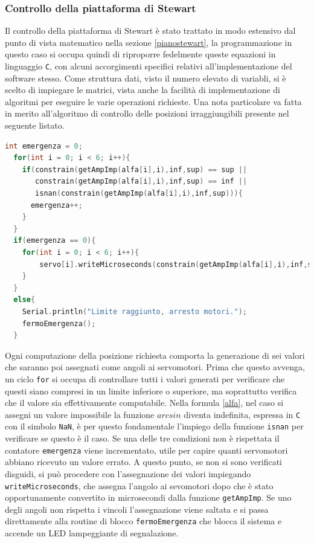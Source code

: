 \documentclass[12pt,twoside,openright]{article}
\begin{document}
\subsubsection{Controllo della piattaforma di Stewart}
Il controllo della piattaforma di Stewart è stato trattato in modo estensivo dal punto di vista matematico nella sezione \ref{pianostewart}, la programmazione in questo caso si occupa quindi di riproporre fedelmente queste equazioni in linguaggio \texttt{C}, con alcuni accorgimenti specifici relativi all'implementazione del software stesso. Come struttura dati, visto il numero elevato di variabli, si è scelto di impiegare le matrici, vista anche la facilità di implementazione di algoritmi per eseguire le varie operazioni richieste. Una nota particolare va fatta in merito all'algoritmo di controllo delle posizioni irraggiungibili presente nel seguente listato.
\begin{lstlisting}[language=C]
int emergenza = 0;
  for(int i = 0; i < 6; i++){
    if(constrain(getAmpImp(alfa[i],i),inf,sup) == sup ||
       constrain(getAmpImp(alfa[i],i),inf,sup) == inf ||
       isnan(constrain(getAmpImp(alfa[i],i),inf,sup))){     
      emergenza++;
    }
  }
  if(emergenza == 0){
    for(int i = 0; i < 6; i++){
        servo[i].writeMicroseconds(constrain(getAmpImp(alfa[i],i),inf,sup));
    }
  }
  else{
    Serial.println("Limite raggiunto, arresto motori.");
    fermoEmergenza();
  }
\end{lstlisting}
Ogni computazione della posizione richiesta comporta la generazione di sei valori che saranno poi assegnati come angoli ai servomotori. Prima che questo avvenga, un ciclo \texttt{for} si occupa di controllare tutti i valori generati per verificare che questi siano compresi in un limite inferiore o superiore, ma soprattutto verifica che il valore sia effettivamente computabile. Nella formula \eqref{alfa}, nel caso si assegni un valore impossibile la funzione $arcsin$ diventa indefinita, espressa in \texttt{C} con il simbolo \texttt{NaN}, è per questo fondamentale l'impiego della funzione \texttt{isnan} per verificare se questo è il caso. Se una delle tre condizioni non è rispettata il contatore \texttt{emergenza} viene incrementato, utile per capire quanti servomotori abbiano ricevuto un valore errato. A questo punto, se non si sono verificati disguidi, si può procedere con l'assegnazione dei valori impiegando \texttt{writeMicroseconds}, che assegna l'angolo ai sevomotori dopo che è stato opportunamente convertito in microsecondi dalla funzione \texttt{getAmpImp}.
Se uno degli angoli non rispetta i vincoli l'assegnazione viene saltata e si passa direttamente alla routine di blocco \texttt{fermoEmergenza} che blocca il sistema e accende un LED lampeggiante di segnalazione.
\end{document}

